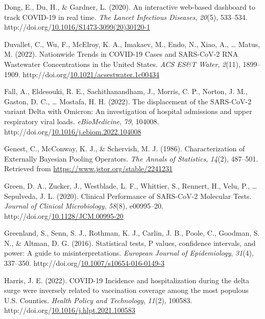 \documentclass[12pt,twoside]{smiththesis}
\newlength{\cslhangindent}
\newenvironment{CSLReferences}[2] %
 {%
\setlength{\parindent}{0pt}
\ifodd #1 \everypar{\setlength{\hangindent}{\cslhangindent}}\ignorespaces\fi
\ifnum #2 > 0
\setlength{\parskip}{#2\baselineskip}
  \fi
}%
{}
\begin{document}
\begin{CSLReferences}{1}{0}
\leavevmode{}%
Dong, E., Du, H., \& Gardner, L. (2020). An interactive web-based dashboard to track {COVID-19} in real time. \emph{The Lancet Infectious Diseases}, \emph{20}(5), 533--534. http://doi.org/\href{https://doi.org/10.1016/S1473-3099(20)30120-1}{10.1016/S1473-3099(20)30120-1}

\leavevmode{}%
Duvallet, C., Wu, F., McElroy, K. A., Imakaev, M., Endo, N., Xiao, A., \ldots{} Matus, M. (2022). Nationwide {Trends} in {COVID-19 Cases} and {SARS-CoV-2 RNA Wastewater Concentrations} in the {United States}. \emph{ACS ES\&T Water}, \emph{2}(11), 1899--1909. http://doi.org/\href{https://doi.org/10.1021/acsestwater.1c00434}{10.1021/acsestwater.1c00434}

\leavevmode{}%
Fall, A., Eldesouki, R. E., Sachithanandham, J., Morris, C. P., Norton, J. M., Gaston, D. C., \ldots{} Mostafa, H. H. (2022). The displacement of the {SARS-CoV-2} variant {Delta} with {Omicron}: {An} investigation of hospital admissions and upper respiratory viral loads. \emph{eBioMedicine}, \emph{79}, 104008. http://doi.org/\href{https://doi.org/10.1016/j.ebiom.2022.104008}{10.1016/j.ebiom.2022.104008}

\leavevmode{}%
Genest, C., McConway, K. J., \& Schervish, M. J. (1986). Characterization of {Externally Bayesian Pooling Operators}. \emph{The Annals of Statistics}, \emph{14}(2), 487--501. Retrieved from \url{https://www.jstor.org/stable/2241231}

\leavevmode{}%
Green, D. A., Zucker, J., Westblade, L. F., Whittier, S., Rennert, H., Velu, P., \ldots{} Sepulveda, J. L. (2020). Clinical {Performance} of {SARS-CoV-2 Molecular Tests}. \emph{Journal of Clinical Microbiology}, \emph{58}(8), e00995--20. http://doi.org/\href{https://doi.org/10.1128/JCM.00995-20}{10.1128/JCM.00995-20}

\leavevmode{}%
Greenland, S., Senn, S. J., Rothman, K. J., Carlin, J. B., Poole, C., Goodman, S. N., \& Altman, D. G. (2016). Statistical tests, {P} values, confidence intervals, and power: A guide to misinterpretations. \emph{European Journal of Epidemiology}, \emph{31}(4), 337--350. http://doi.org/\href{https://doi.org/10.1007/s10654-016-0149-3}{10.1007/s10654-016-0149-3}

\leavevmode{}%
Harris, J. E. (2022). {COVID-19 Incidence} and hospitalization during the delta surge were inversely related to vaccination coverage among the most populous {U}.{S}. {Counties}. \emph{Health Policy and Technology}, \emph{11}(2), 100583. http://doi.org/\href{https://doi.org/10.1016/j.hlpt.2021.100583}{10.1016/j.hlpt.2021.100583}


\end{CSLReferences}
\end{document}
